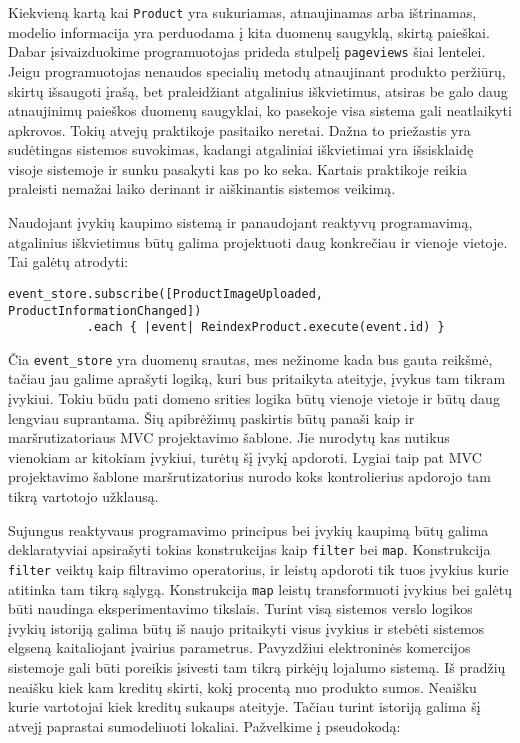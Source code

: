 Kiekvieną kartą kai \lstinline|Product| yra sukuriamas, atnaujinamas arba ištrinamas, modelio informacija yra perduodama į kita duomenų saugyklą, skirtą paieškai. Dabar įsivaizduokime programuotojas prideda stulpelį \lstinline|pageviews| šiai lentelei. Jeigu programuotojas nenaudos specialių metodų atnaujinant produkto peržiūrų, skirtų išsaugoti įrašą, bet praleidžiant atgalinius iškvietimus, atsiras be galo daug atnaujinimų paieškos duomenų saugyklai, ko pasekoje visa sistema gali neatlaikyti apkrovos. Tokių atvejų praktikoje pasitaiko neretai. Dažna to priežastis yra sudėtingas sistemos suvokimas, kadangi atgaliniai iškvietimai yra išsisklaidę visoje sistemoje ir sunku pasakyti kas po ko seka. Kartais praktikoje reikia praleisti nemažai laiko derinant ir aiškinantis sistemos veikimą.

Naudojant įvykių kaupimo sistemą ir panaudojant reaktyvų programavimą, atgalinius iškvietimus būtų galima projektuoti daug konkrečiau ir vienoje vietoje. Tai galėtų atrodyti:

\begin{lstlisting}[]
event_store.subscribe([ProductImageUploaded, ProductInformationChanged])
           .each { |event| ReindexProduct.execute(event.id) }
\end{lstlisting}

Čia \lstinline|event_store| yra duomenų srautas, mes nežinome kada bus gauta reikšmė, tačiau jau galime aprašyti logiką, kuri bus pritaikyta ateityje, įvykus tam tikram įvykiui. Tokiu būdu pati domeno srities logika būtų vienoje vietoje ir būtų daug lengviau suprantama. Šių apibrėžimų paskirtis būtų panaši kaip ir maršrutizatoriaus MVC projektavimo šablone. Jie nurodytų kas nutikus vienokiam ar kitokiam įvykiui, turėtų šį įvykį apdoroti. Lygiai taip pat MVC projektavimo šablone maršrutizatorius nurodo koks kontrolierius apdorojo tam tikrą vartotojo užklausą.

Sujungus reaktyvaus programavimo principus bei įvykių kaupimą būtų galima deklaratyviai apsirašyti tokias konstrukcijas kaip \lstinline|filter| bei \lstinline|map|. Konstrukcija \lstinline|filter| veiktų kaip filtravimo operatorius, ir leistų apdoroti tik tuos įvykius kurie atitinka tam tikrą sąlygą. Konstrukcija \lstinline|map| leistų transformuoti įvykius bei galėtų būti naudinga eksperimentavimo tikslais. Turint visą sistemos verslo logikos įvykių istoriją galima būtų iš naujo pritaikyti visus įvykius ir stebėti sistemos elgseną kaitaliojant įvairius parametrus. Pavyzdžiui elektroninės komercijos sistemoje gali būti poreikis įsivesti tam tikrą pirkėjų lojalumo sistemą. Iš pradžių neaišku kiek kam kreditų skirti, kokį procentą nuo produkto sumos. Neaišku kurie vartotojai kiek kreditų sukaups ateityje. Tačiau turint istoriją galima šį atvejį paprastai sumodeliuoti lokaliai. Pažvelkime į pseudokodą:

